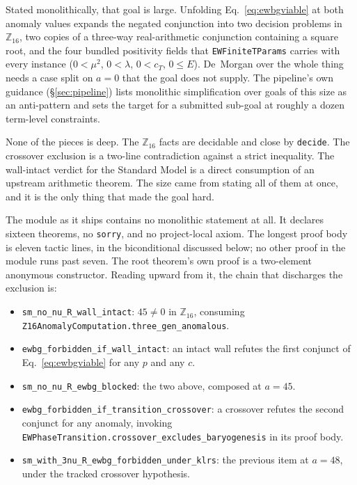 \documentclass[11pt]{article}
\begin{document}
Stated monolithically, that goal is large. Unfolding
Eq.~\eqref{eq:ewbgviable} at both anomaly values expands the negated
conjunction into two decision problems in $\mathbb{Z}_{16}$, two copies
of a three-way real-arithmetic conjunction containing a square root,
and the four bundled positivity fields that \texttt{EWFiniteTParams}
carries with every instance ($0 < \mu^2$, $0 < \lambda$, $0 < c_T$,
$0 \leq E$). De~Morgan over the whole thing needs a case split on
$a = 0$ that the goal does not supply. The pipeline's own guidance
(\S\ref{sec:pipeline}) lists monolithic simplification over goals of
this size as an anti-pattern and sets the target for a submitted
sub-goal at roughly a dozen term-level constraints.

None of the pieces is deep. The $\mathbb{Z}_{16}$ facts are decidable
and close by \texttt{decide}. The crossover exclusion is a two-line
contradiction against a strict inequality. The wall-intact verdict for
the Standard Model is a direct consumption of an upstream arithmetic
theorem. The size came from stating all of them at once, and it is the
only thing that made the goal hard.


The module as it ships contains no monolithic statement at all. It
declares sixteen theorems, no \texttt{sorry}, and no project-local
axiom. The longest proof body is eleven tactic lines, in the
biconditional discussed below; no other proof in the module runs past
seven. The root theorem's own proof is a two-element anonymous
constructor. Reading upward from it, the chain that discharges the
exclusion is:

\begin{itemize}
\item \texttt{sm\_no\_nu\_R\_wall\_intact}: $45 \neq 0$ in
$\mathbb{Z}_{16}$, consuming
\texttt{Z16AnomalyComputation.three\_gen\_anomalous}.
\item \texttt{ewbg\_forbidden\_if\_wall\_intact}: an intact wall
refutes the first conjunct of Eq.~\eqref{eq:ewbgviable} for any $p$ and
any $c$.
\item \texttt{sm\_no\_nu\_R\_ewbg\_blocked}: the two above, composed at
$a = 45$.
\item \texttt{ewbg\_forbidden\_if\_transition\_crossover}: a crossover
refutes the second conjunct for any anomaly, invoking
\texttt{EWPhaseTransition.crossover\_excludes\_baryogenesis} in its
proof body.
\item \texttt{sm\_with\_3nu\_R\_ewbg\_forbidden\_under\_klrs}: the
previous item at $a = 48$, under the tracked crossover hypothesis.
\end{itemize}
\end{document}

